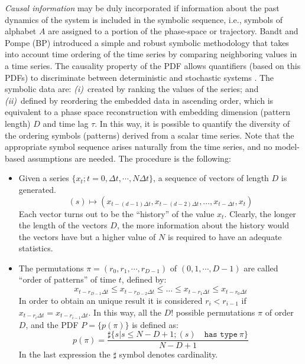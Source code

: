 {\it Causal information\/} may be duly incorporated if information about the past dynamics of the system is included in the symbolic sequence, i.e., symbols of alphabet $A$ are assigned to a portion of the phase-space or trajectory.
Bandt and Pompe (BP)\cite{Bandt2002} introduced a simple and robust symbolic methodology that takes into account time ordering of the time series by comparing neighboring values in a time series.
The causality property of the PDF allows quantifiers (based on this PDFs) to discriminate between deterministic and stochastic systems \cite{Rosso2007B}.
The symbolic data are:
{\it (i)\/}~created by ranking the values of the series; and
{\it (ii)\/}~defined by reordering the embedded data in ascending order, which is equivalent to a phase space reconstruction with embedding dimension (pattern length) $D$ and time lag $\tau$.
In this way, it is possible to quantify the diversity of the ordering symbols (patterns) derived from a scalar time series.
Note that the appropriate symbol sequence arises naturally from the time series, and no model-based assumptions 
are needed.
The procedure is the following:
\begin{itemize}
	\item Given a series $\{x_t; t=0, \Delta t, \cdots,N\Delta t \}$, a sequence of vectors of length $D$ is generated.
		\begin{equation}
		(s)\longmapsto\left(x_{t-(d-1)\Delta t},x_{t-(d-2)\Delta t},\dots,x_{t-\Delta t},x_{t}\right) 
		\label{eq:vectores}
		\end{equation}
		Each vector turns out to be the ``history'' of the value $x_t$. Clearly, the longer the length of the vectors $D$, the more information about the history would the vectors have but a higher value of $N$ is required to have an adequate statistics. 
	\item The permutations $\pi=(r_0, r_1, \cdots, r_{D-1})$ of $(0, 1, \cdots, D-1)$ are called ``order of patterns'' of time $t$, defined by:
		\begin{equation}
		\label{eq:permuta}
		x_{t-r_{D-1}\Delta t}\le x_{t-r_{D-2}\Delta t}\le\dots\le x_{t-r_{1}\Delta t}\le x_{t-r_0\Delta t}
		\end{equation}
		In order to obtain an unique result it is considered $r_i<r_{i-1}$ if $x_{t-r_{i}\Delta t}=x_{t-r_{i-1}\Delta t}$.
		In this way, all the $D!$ possible permutations $\pi$ of order $D$, and the PDF $P=\{p(\pi)\}$ is defined as:
		\begin{equation}
		\label{eq:frequ}
		p(\pi)=\frac{\sharp \{s|s\leq N-D+1; (s) \quad \texttt{has type}~\pi\}}{N-D+1}
		\end{equation}
		In the last expression the $\sharp$ symbol denotes cardinality.
\end{itemize}
